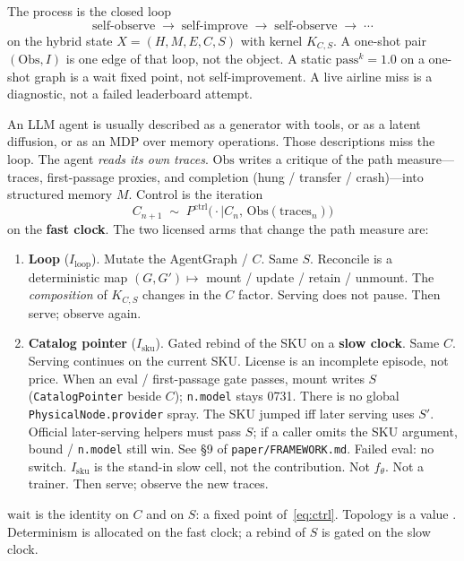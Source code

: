 \documentclass{article}
\begin{document}
The process is the closed loop
\[
\text{self-observe}\;\to\;\text{self-improve}\;\to\;\text{self-observe}\;\to\;\cdots
\]
on the hybrid state \(X=(H,M,E,C,S)\) with kernel \(K_{C,S}\). A one-shot pair \((\mathrm{Obs},I)\) is one edge of that loop, not the object. A static \(\mathrm{pass}^k=1.0\) on a one-shot graph is a wait fixed point, not self-improvement. A live airline miss is a diagnostic, not a failed leaderboard attempt.

An LLM agent is usually described as a generator with tools, or as a latent diffusion, or as an MDP over memory operations. Those descriptions miss the loop. The agent \emph{reads its own traces}. \(\mathrm{Obs}\) writes a critique of the path measure---traces, first-passage proxies, and completion (hung / transfer / crash)---into structured memory \(M\). Control is the iteration
\begin{equation}
\label{eq:ctrl}
C_{n+1}\;\sim\; P^{\mathrm{ctrl}}\big(\cdot\mid C_n,\,\mathrm{Obs}(\mathrm{traces}_n)\big)
\end{equation}
on the \textbf{fast clock}. The two licensed arms that change the path measure are:
\begin{enumerate}
\item \textbf{Loop} (\(I_{\mathrm{loop}}\)). Mutate the AgentGraph / \(C\). Same \(S\). Reconcile is a deterministic map \((G,G')\mapsto\) mount / update / retain / unmount. The \emph{composition} of \(K_{C,S}\) changes in the \(C\) factor. Serving does not pause. Then serve; observe again.
\item \textbf{Catalog pointer} (\(I_{\mathrm{sku}}\)). Gated rebind of the SKU on a \textbf{slow clock}. Same \(C\). Serving continues on the current SKU. License is an incomplete episode, not price. When an eval / first-passage gate passes, mount writes \(S\) (\texttt{CatalogPointer} beside \(C\)); \texttt{n.model} stays 0731. There is no global \texttt{PhysicalNode.provider} spray. The SKU jumped iff later serving uses \(S'\). Official later-serving helpers must pass \(S\); if a caller omits the SKU argument, bound / \texttt{n.model} still win. See \S9 of \texttt{paper/FRAMEWORK.md}. Failed eval: no switch. \(I_{\mathrm{sku}}\) is the stand-in slow cell, not the contribution. Not \(f_\theta\). Not a trainer. Then serve; observe the new traces.
\end{enumerate}
\(\mathrm{wait}\) is the identity on \(C\) and on \(S\): a fixed point of~\eqref{eq:ctrl}. Topology is a value \citep{vdomharness}. Determinism is allocated on the fast clock; a rebind of \(S\) is gated on the slow clock.
\end{document}
